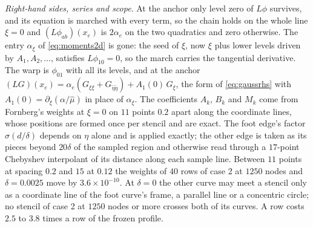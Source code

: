 \documentclass[11pt]{amsart}
\theoremstyle{definition}
\theoremstyle{remark}
\newcommand{\para}[1]{\par\smallskip\noindent\textit{#1}.\enspace}
\newcommand{\sci}[2]{#1 \times 10^{#2}}
\begin{document}
\para{Right-hand sides, series and scope}
At the anchor only level zero of $L \phi$ survives, and its equation is
marched with every term, so the chain holds on the whole line $\xi = 0$ and
$(L \phi_{ab})(x_e)$ is $2 \alpha_e$ on the two quadratics and zero
otherwise. The entry $\alpha_\xi$ of \eqref{eq:moments2d} is gone: the
seed of $\xi$, now $\xi$ plus lower levels driven by $A_1, A_2, \ldots$,
satisfies $L \phi_{10} = 0$, so the march carries the tangential derivative.
The warp is $\phi_{01}$ with all its levels, and at the anchor
$(L G)(x_e) = \alpha_e (G_{\xi\xi} + G_{\tilde\eta\tilde\eta}) + A_1(0)\,
G_\xi$, the form of \eqref{eq:gaussrhs} with $A_1(0) = \partial_\xi (\alpha
/ \hat\mu)$ in place of $\alpha_\xi$. The coefficients $A_k$, $B_k$ and
$M_k$ come from Fornberg's weights \cite{Fornberg1988} at $\xi = 0$ on $11$
points $0.2$ apart along the coordinate lines, whose positions are formed
once per stencil and are exact. The foot edge's factor $\sigma(d / \delta)$
depends on $\eta$ alone and is applied exactly; the other edge is taken as
its pieces beyond $20\delta$ of the sampled region and otherwise read
through a $17$-point Chebyshev interpolant of its distance along each
sample line. Between $11$ points at spacing $0.2$ and $15$ at $0.12$ the
weights of $40$ rows of case 2 at $1250$ nodes and $\delta = 0.0025$ move by
$\sci{3.6}{-10}$. At $\delta = 0$ the other curve may meet a stencil only as
a coordinate line of the foot curve's frame, a parallel line or a
concentric circle; no stencil of case 2 at $1250$ nodes or more crosses both
of its curves. A row costs $2.5$ to $3.8$ times a row of the frozen profile.
\end{document}
